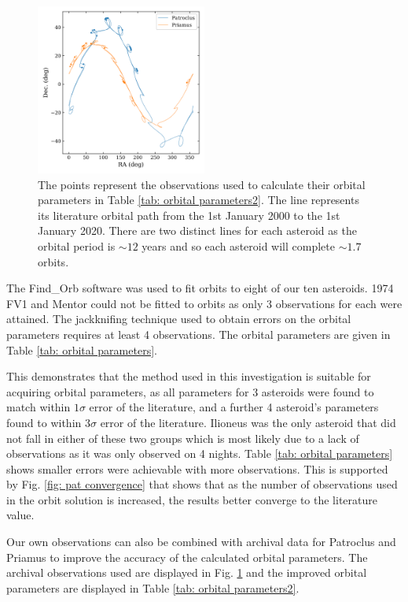 \documentclass[10pt, twocolumn]{revtex4}    %
\begin{document}
\begin{figure}[h!]
\centering
\includegraphics[width=0.5\textwidth]{20180402_171730_OBSERVATIONS_MAP}
\caption{The points represent the observations used to calculate their orbital parameters in Table \ref{tab: orbital parameters2}. The line represents its literature orbital path from the 1st January 2000 to the 1st January 2020. There are two distinct lines for each asteroid as the orbital period is ${\sim}12$ years and so each asteroid will complete ${\sim}1.7$ orbits.}
\label{fig: observations2}
\end{figure}

The Find\_Orb software was used to fit orbits to eight of our ten asteroids. 1974 FV1 and Mentor could not be fitted to orbits as only $3$ observations for each were attained. The jackknifing technique used to obtain errors on the orbital parameters requires at least 4 observations. The orbital parameters are given in Table \ref{tab: orbital parameters}.

This demonstrates that the method used in this investigation is suitable for acquiring orbital parameters, as all parameters for 3 asteroids were found to match within $1\sigma$ error of the literature, and a further 4 asteroid's parameters found to within $3\sigma$ error of the literature. Ilioneus was the only asteroid that did not fall in either of these two groups which is most likely due to a lack of observations as it was only observed on 4 nights. Table \ref{tab: orbital parameters} shows smaller errors were achievable with more observations. This is supported by Fig. \ref{fig: pat convergence} that shows that as the number of observations used in the orbit solution is increased, the results better converge to the literature value.

Our own observations can also be combined with archival data for Patroclus and Priamus to improve the accuracy of the calculated orbital parameters. The archival observations used are displayed in Fig. \ref{fig: observations2} and the improved orbital parameters are displayed in Table \ref{tab: orbital parameters2}.
\end{document}
